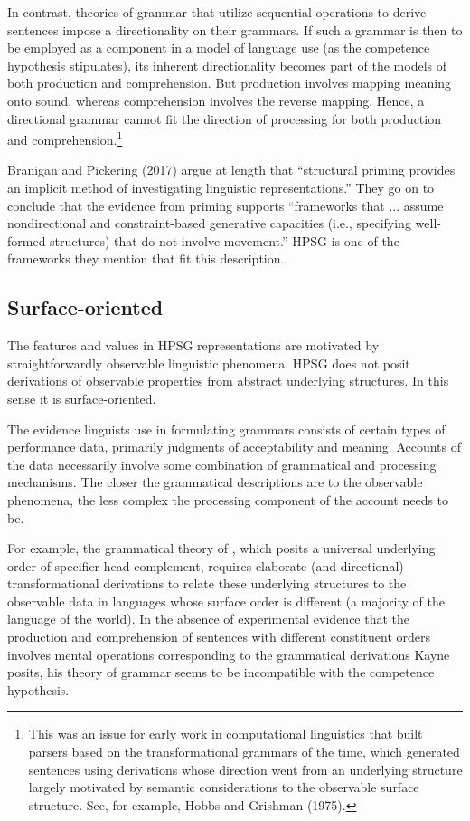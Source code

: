 \documentclass[a4paper]{article}
\begin{document}
In contrast, theories of grammar that utilize sequential operations to derive sentences impose a directionality on their grammars.  If such a grammar is then to be employed as a component in a model of language use (as the competence hypothesis stipulates), its inherent directionality becomes part of the models of both production and comprehension.  But production involves mapping meaning onto sound, whereas comprehension involves the reverse mapping.  Hence, a directional grammar cannot fit the direction of processing for both production and comprehension.\footnote{This was an issue for early work in computational linguistics that built parsers based on the transformational grammars of the time, which generated sentences using derivations whose direction went from an underlying structure largely motivated by semantic considerations to the observable surface structure.  See, for example, Hobbs and Grishman (1975).}  

Branigan and Pickering (2017) argue at length that ``structural priming provides an implicit method of investigating linguistic representations.''  They go on to conclude that the evidence from priming supports ``frameworks that ... assume nondirectional and constraint-based generative
capacities (i.e., specifying well-formed structures) that
do not involve movement.''  HPSG is one of the frameworks they mention that fit this description.

\subsection{Surface-oriented}

The features and values in HPSG representations are motivated by straightforwardly observable
linguistic phenomena. HPSG does not posit derivations of observable properties from abstract
underlying structures.  In this sense it is surface-oriented.

The evidence linguists use in formulating grammars consists of certain types of performance data,
primarily judgments of acceptability and meaning.  Accounts of the data necessarily involve some
combination of grammatical and processing mechanisms.  The closer the grammatical descriptions are
to the observable phenomena, the less complex the processing component of the account needs to be.

For example, the grammatical theory of \citet{Kayne94a-u}, which posits a universal underlying order of
specifier-head-complement, requires elaborate (and directional) transformational derivations to
relate these underlying structures to the observable data in languages whose surface order is
different (a majority of the language of the world).  In the absence of experimental evidence that
the production and comprehension of sentences with different constituent orders involves mental
operations corresponding to the grammatical derivations Kayne posits, his theory of grammar seems to
be incompatible with the competence hypothesis.
\end{document}
